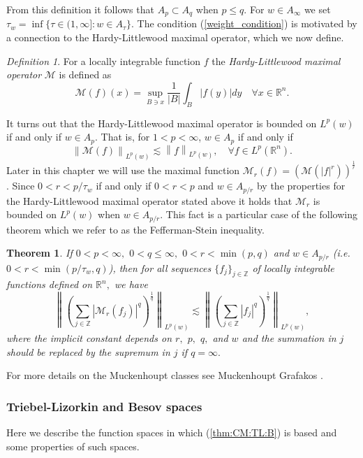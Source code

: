\documentclass[10pt,a4paper]{article}
\newtheorem{theorem}{Theorem}[section]
\theoremstyle{remark}
\newtheorem{dfn}{Definition}[section]
\newcommand{\ent}{\mathbb{Z}}
\newcommand{\rn}{{{\mathbb R}^n}}
\newcommand{\lebw}[2]{L^{#1}(#2)} %
\newcommand{\M}{\mathcal{M}} %
\newcommand{\abs}[1]{\left\vert #1 \right\vert}
\newcommand{\norm}[2]{\left\|#1\right\|_{#2}}
\begin{document}
From this definition it follows that $A_p \subset A_q$ when $p\leq q$. 
For $w\in A_\infty$ we set 
$\tau_w = \inf\{\tau \in (1,\infty]: w\in A_\tau \}$. 
The condition (\ref{weight_condition}) is motivated by a connection to the Hardy-Littlewood maximal operator, which we now define.
\begin{dfn}
For a locally integrable function $f$ the \textit{Hardy-Littlewood maximal operator} $\mathcal{M}$ is defined as 
\[ \mathcal{M}(f)(x)  = \sup_{B \ni x} \frac{1}{|B|}\int_B |f(y)|dy \quad \forall x\in\mathbb{R}^n. \]
\end{dfn}
It turns out that the Hardy-Littlewood maximal operator is bounded on $L^p(w)$ if and only if $w\in A_p$. That is, for $1<p<\infty$, $w\in A_p$ if and only if 
\[\norm{\mathcal{M}(f)}{L^p (w)} \lesssim \norm{f}{L^p (w)}, \quad \forall f\in L^p(\rn). \]
Later in this chapter we will use the maximal function $\mathcal{M}_r (f) = \left(\mathcal{M}(|f|^r)\right)^{\frac{1}{r}}$. Since $0<r<p/\tau_w$ if and only if $0<r<p$ and $w\in A_{p/r}$ by the properties for the Hardy-Littlewood maximal operator stated above it holds that $\mathcal{M}_r$ is bounded on $L^p (w)$ when $w\in A_{p/r}$. This fact is a particular case of the following theorem which we refer to as the Fefferman-Stein inequality.

\begin{theorem}
If $0<p<\infty,$ $0<q\le \infty,$  $0<r <\min(p,q)$ and $w \in A_{p/r}$ (i.e. $0<r<\min(p/\tau_w,q)$), then for all sequences $\{f_{j}\}_{j\in\ent}$ of locally integrable functions defined on $\rn,$ we have
 \begin{equation*}
 \norm{\left(\sum_{j\in\ent}\abs{\M_r (f_j)}^q\right)^{\frac{1}{q}}}{\lebw{p}{w}}\lesssim
 \norm{\left(\sum_{j\in\ent}\abs{f_j}^q\right)^{\frac{1}{q}}}{\lebw{p}{w}},\label{eq:wFS}
 \end{equation*}
where the implicit constant depends on $r,$ $p,$ $q,$ and $w$ and the summation in $j$ should be replaced by the supremum in $j$ if $q=\infty.$
\end{theorem}
For more details on the Muckenhoupt classes see Muckenhoupt \cite{MR0293384} Grafakos \cite{MR3243741}.

\subsubsection{Triebel-Lizorkin and Besov spaces}\label{TL_B_section}
Here we describe the function spaces in which (\ref{thm:CM:TL:B}) is based and some properties of such spaces. 
\end{document}
